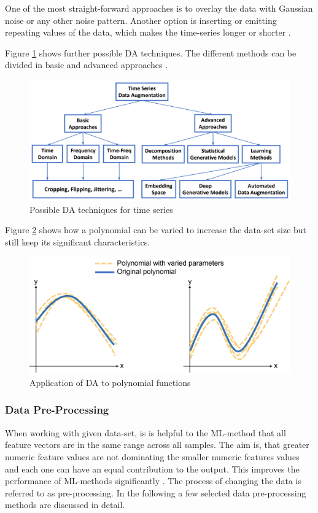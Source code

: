 One of the most straight-forward approaches is to overlay the data with Gaussian noise or any other noise pattern. Another option is inserting or emitting repeating values of the data, which makes the time-series longer or shorter \cite{Wen}.

Figure \ref{fig:DA} shows further possible DA techniques. The different methods can be divided in basic and advanced approaches \cite{Wen}.

\begin{figure}[H]
	\centering
	\includegraphics[width=0.9\linewidth]{IMGs/DA.png}
	\caption{Possible DA techniques for time series \cite{Wen}}
	\label{fig:DA}
\end{figure}

Figure \ref{fig:DA2} shows how a polynomial can be varied to increase the data-set size but still keep its significant characteristics.

\begin{figure}[H]
	\centering
	\includegraphics[width=0.8\linewidth]{IMGs/DA2.png}
	\caption{Application of DA to polynomial functions}
	\label{fig:DA2}
\end{figure}

\subsubsection*{Data Pre-Processing}
When working with given data-set, is is helpful to the ML-method that all feature vectors are in the same range across all samples.
The aim is, that greater numeric feature values are not dominating the smaller numeric features values and each one can have an equal contribution to the output. This improves the performance of ML-methods significantly \cite{Singh}. The process of changing the data is referred to as pre-processing. In the following a few selected data pre-processing methods are discussed in detail.

